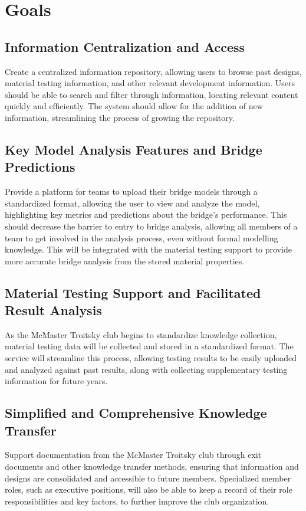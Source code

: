 \documentclass{article}
\begin{document}
\section{Goals}

\subsection{Information Centralization and Access}
Create a centralized information repository, allowing users to browse past designs, material testing 
information, and other relevant development information. Users should be able to search and filter through 
information, locating relevant content quickly and efficiently. The system should allow for the addition of 
new information, streamlining the process of growing the repository.

\subsection{Key Model Analysis Features and Bridge Predictions}
Provide a platform for teams to upload their bridge models through a standardized format, allowing the user to 
view and analyze the model, highlighting key metrics and predictions about the bridge's performance. This should decrease 
the barrier to entry to bridge analysis, allowing all members of a team to get involved in the analysis process, even without 
formal modelling knowledge. This will be integrated with the material testing support to provide more accurate 
bridge analysis from the stored material properties.

\subsection{Material Testing Support and Facilitated Result Analysis}
As the McMaster Troitsky club begins to standardize knowledge collection, material testing data 
will be collected and stored in a standardized format. The service will streamline this process, allowing 
testing results to be easily uploaded and analyzed against past results, along with collecting supplementary 
testing information for future years.

\subsection{Simplified and Comprehensive Knowledge Transfer}
Support documentation from the McMaster Troitsky club through exit documents and other knowledge transfer 
methods, ensuring that information and designs are consolidated and accessible to future members. 
Specialized member roles, such as executive positions, will also be able to keep a record of their role responsibilities 
and key factors, to further improve the club organization.
\end{document}

